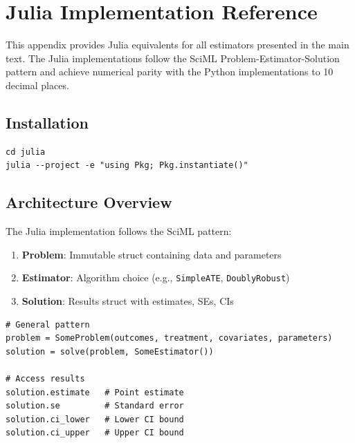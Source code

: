 \chapter{Julia Implementation Reference}
\label{app:julia}


This appendix provides Julia equivalents for all estimators presented in the main text. The Julia implementations follow the SciML Problem-Estimator-Solution pattern and achieve numerical parity with the Python implementations to 10 decimal places.

\section{Installation}

\begin{verbatim}
cd julia
julia --project -e "using Pkg; Pkg.instantiate()"
\end{verbatim}

\section{Architecture Overview}

The Julia implementation follows the SciML pattern:

\begin{enumerate}
    \item \textbf{Problem}: Immutable struct containing data and parameters
    \item \textbf{Estimator}: Algorithm choice (e.g., \texttt{SimpleATE}, \texttt{DoublyRobust})
    \item \textbf{Solution}: Results struct with estimates, SEs, CIs
\end{enumerate}

\begin{verbatim}
# General pattern
problem = SomeProblem(outcomes, treatment, covariates, parameters)
solution = solve(problem, SomeEstimator())

# Access results
solution.estimate   # Point estimate
solution.se         # Standard error
solution.ci_lower   # Lower CI bound
solution.ci_upper   # Upper CI bound
\end{verbatim}

